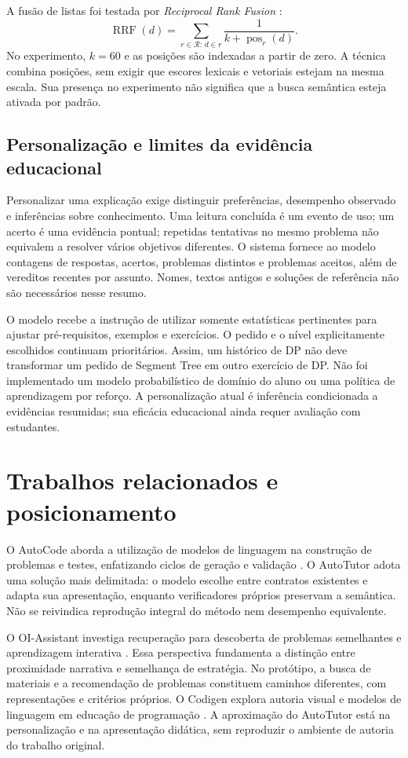 \documentclass[12pt]{article}
\begin{document}
A fusão de listas foi testada por \emph{Reciprocal Rank Fusion} \cite{cormack2009}:
\begin{equation}
 \operatorname{RRF}(d)=\sum_{r\in\mathcal R:\,d\in r}\frac{1}{k+\operatorname{pos}_r(d)}.
\end{equation}
No experimento, $k=60$ e as posições são indexadas a partir de zero. A técnica combina posições, sem exigir que escores lexicais e vetoriais estejam na mesma escala. Sua presença no experimento não significa que a busca semântica esteja ativada por padrão.

\subsection{Personalização e limites da evidência educacional}
Personalizar uma explicação exige distinguir preferências, desempenho observado e inferências sobre conhecimento. Uma leitura concluída é um evento de uso; um acerto é uma evidência pontual; repetidas tentativas no mesmo problema não equivalem a resolver vários objetivos diferentes. O sistema fornece ao modelo contagens de respostas, acertos, problemas distintos e problemas aceitos, além de vereditos recentes por assunto. Nomes, textos antigos e soluções de referência não são necessários nesse resumo.

O modelo recebe a instrução de utilizar somente estatísticas pertinentes para ajustar pré-requisitos, exemplos e exercícios. O pedido e o nível explicitamente escolhidos continuam prioritários. Assim, um histórico de DP não deve transformar um pedido de Segment Tree em outro exercício de DP. Não foi implementado um modelo probabilístico de domínio do aluno ou uma política de aprendizagem por reforço. A personalização atual é inferência condicionada a evidências resumidas; sua eficácia educacional ainda requer avaliação com estudantes.

\section{Trabalhos relacionados e posicionamento}
O AutoCode aborda a utilização de modelos de linguagem na construção de problemas e testes, enfatizando ciclos de geração e validação \cite{zhou2026}. O AutoTutor adota uma solução mais delimitada: o modelo escolhe entre contratos existentes e adapta sua apresentação, enquanto verificadores próprios preservam a semântica. Não se reivindica reprodução integral do método nem desempenho equivalente.

O OI-Assistant investiga recuperação para descoberta de problemas semelhantes e aprendizagem interativa \cite{su2025}. Essa perspectiva fundamenta a distinção entre proximidade narrativa e semelhança de estratégia. No protótipo, a busca de materiais e a recomendação de problemas constituem caminhos diferentes, com representações e critérios próprios. O Codigen explora autoria visual e modelos de linguagem em educação de programação \cite{codigen2025}. A aproximação do AutoTutor está na personalização e na apresentação didática, sem reproduzir o ambiente de autoria do trabalho original.
\end{document}
